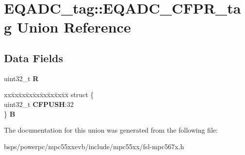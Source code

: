 \hypertarget{unionEQADC__tag_1_1EQADC__CFPR__tag}{}\section{E\+Q\+A\+D\+C\+\_\+tag\+::E\+Q\+A\+D\+C\+\_\+\+C\+F\+P\+R\+\_\+tag Union Reference}
\label{unionEQADC__tag_1_1EQADC__CFPR__tag}
\subsection*{Data Fields}
\begin{DoxyCompactItemize}
\item 
\mbox{\label{unionEQADC__tag_1_1EQADC__CFPR__tag_a811f8de3c26e4853f1ef083ab7ada792}} 
uint32\+\_\+t {\bfseries R}
\item 
\mbox{\label{unionEQADC__tag_1_1EQADC__CFPR__tag_a4992f736204e624c880a25d2569e4af6}} 
\begin{tabbing}
xx\=xx\=xx\=xx\=xx\=xx\=xx\=xx\=xx\=\kill
struct \{\\
\>uint32\_t {\bfseries CFPUSH}:32\\
\} {\bfseries B}\\

\end{tabbing}\end{DoxyCompactItemize}


The documentation for this union was generated from the following file\+:\begin{DoxyCompactItemize}
\item 
bsps/powerpc/mpc55xxevb/include/mpc55xx/fsl-\/mpc567x.\+h\end{DoxyCompactItemize}
